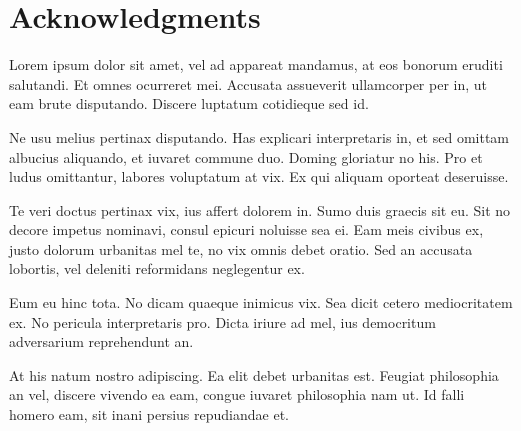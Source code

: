 \chapter*{\Large Acknowledgments}

Lorem ipsum dolor sit amet, vel ad appareat mandamus, at eos bonorum eruditi salutandi. Et omnes ocurreret mei. Accusata assueverit ullamcorper per in, ut eam brute disputando. Discere luptatum cotidieque sed id.

Ne usu melius pertinax disputando. Has explicari interpretaris in, et sed omittam albucius aliquando, et iuvaret commune duo. Doming gloriatur no his. Pro et ludus omittantur, labores voluptatum at vix. Ex qui aliquam oporteat deseruisse.

Te veri doctus pertinax vix, ius affert dolorem in. Sumo duis graecis sit eu. Sit no decore impetus nominavi, consul epicuri noluisse sea ei. Eam meis civibus ex, justo dolorum urbanitas mel te, no vix omnis debet oratio. Sed an accusata lobortis, vel deleniti reformidans neglegentur ex.

Eum eu hinc tota. No dicam quaeque inimicus vix. Sea dicit cetero mediocritatem ex. No pericula interpretaris pro. Dicta iriure ad mel, ius democritum adversarium reprehendunt an.

At his natum nostro adipiscing. Ea elit debet urbanitas est. Feugiat philosophia an vel, discere vivendo ea eam, congue iuvaret philosophia nam ut. Id falli homero eam, sit inani persius repudiandae et.
